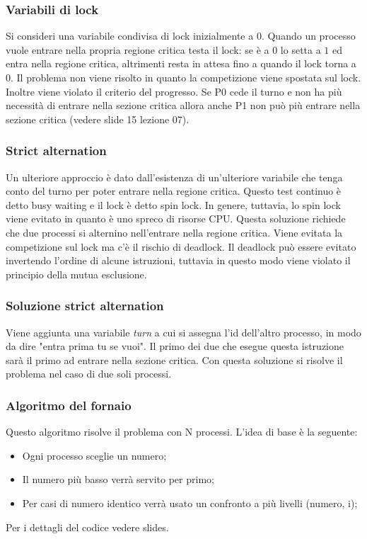 \subsubsection{Variabili di lock}
Si consideri una variabile condivisa di lock inizialmente a $0$. Quando un processo vuole entrare nella propria regione critica testa il lock: se è a $0$ lo setta a $1$ ed entra nella
regione critica, altrimenti resta in attesa fino a quando il lock torna a $0$. Il problema non viene risolto in quanto la competizione viene spostata sul lock.
Inoltre viene violato il criterio del progresso. Se P0 cede il turno e non ha più necessità di entrare nella sezione critica allora anche P1 non può più entrare nella sezione critica (vedere slide 15 lezione 07).

\subsubsection{Strict alternation}
Un ulteriore approccio è dato dall'esistenza di un'ulteriore variabile che tenga conto del turno per poter entrare nella regione critica. Questo test continuo è detto busy waiting e il
lock è detto spin lock. In genere, tuttavia, lo spin lock viene evitato in quanto è uno spreco di risorse CPU. Questa soluzione richiede che due processi si alternino nell'entrare nella regione critica.
Viene evitata la competizione sul lock ma c'è il rischio di deadlock. Il deadlock può essere evitato invertendo l'ordine di alcune istruzioni, tuttavia in questo modo viene violato il principio della mutua esclusione.

\subsubsection{Soluzione strict alternation}
Viene aggiunta una variabile \emph{turn} a cui si assegna l'id dell'altro processo, in modo da dire "entra prima tu se vuoi". Il primo dei due che esegue questa istruzione sarà il primo ad entrare nella sezione critica. Con questa soluzione si risolve il problema nel caso di due soli processi.

\subsubsection{Algoritmo del fornaio}
Questo algoritmo risolve il problema con N processi. L'idea di base è la seguente:
\begin{itemize}
	\item Ogni processo sceglie un numero;
	\item Il numero più basso verrà servito per primo;
	\item Per casi di numero identico verrà usato un confronto a più livelli (numero, i);
\end{itemize}
Per i dettagli del codice vedere slides.

